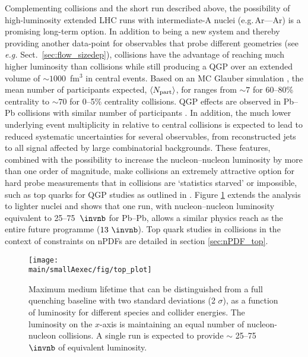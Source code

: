 Complementing \PbPb collisions and the short \OO run described above, 
the possibility of high-luminosity extended LHC runs with intermediate-A nuclei (e.g.\,Ar—Ar)
is a promising long-term option.
In addition to being a new system and thereby providing another data-point for observables that probe different geometries (see \textit{e.g.} Sect.~\ref{sec:flow_sizedep}), \ArAr collisions have the advantage of reaching much higher luminosity than \PbPb collisions while still producing a QGP over an extended volume of $\sim 1000$~fm$^3$ in central events. Based on an MC Glauber simulation \cite{Miller:2007ri}, the mean number of participants expected, $\langle N_{\rm part}\rangle$, for \ArAr ranges from  $\sim 7$ for 60--80\% centrality to $\sim 70$ for 0--5\% centrality collisions.  
QGP effects are observed in Pb--Pb collisions with similar number of participants \cite{Sirunyan:2018eqi, ATLAS-CONF-2018-007}.  In addition, the much lower underlying event multiplicity in \ArAr relative to central \PbPb collisions is expected to lead to reduced  systematic uncertainties for several observables, from reconstructed jets to all signal affected by large combinatorial backgrounds.  These features, combined with the possibility to increase the nucleon--nucleon luminosity by more than one order of magnitude, make \ArAr collisions an extremely attractive option for hard probe measurements that in \PbPb collisions are `statistics starved' or impossible, such as top quarks for QGP studies as outlined in \cite{Apolinario:2017sob}.  Figure \ref{fig:boosted_tops} extends the analysis to lighter nuclei and shows that one \ArAr run, with nucleon--nucleon luminosity equivalent to 25--75~$\invnb$ for Pb--Pb, allows a similar physics reach as the entire \PbPb future programme ($13~\invnb$).  Top quark studies in \ArAr collisions in the context of constraints on nPDFs are detailed in section \ref{sec:nPDF_top}.
\begin{figure}
\centering
\texttt{[image: \\main/smallAexec/fig/top\_plot]}
\caption{Maximum medium lifetime that can be distinguished from a full quenching baseline with two standard deviations (2 $\sigma$), as a function of luminosity for different species and collider energies. The luminosity on the $x$-axis is maintaining an equal number of nucleon-nucleon collisions. A single \ArAr run is expected to provide $\sim$ 25--75 $\invnb$ of \PbPb equivalent luminosity.}
\label{fig:boosted_tops}
\end{figure}

